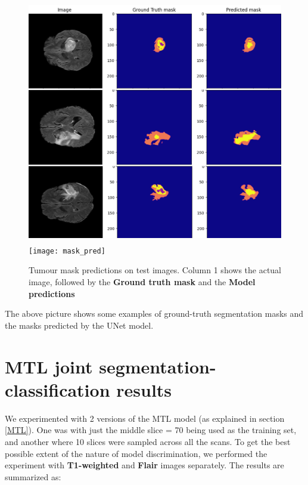 \begin{figure}[H]
  \begin{center}
    \leavevmode
    \ifpdf
      \includegraphics[height=4.2in]{Results/Chapter5Figs/mask_preds.png}
    \else
      \texttt{[image: mask\_pred]}
    \fi
    \caption{Tumour mask predictions on test images. Column 1 shows the actual image, followed by the \textbf{Ground truth mask} and the \textbf{Model predictions}}
    \label{mask_pred}
  \end{center}
\end{figure}

The above picture shows some examples of ground-truth segmentation masks and the masks predicted by the UNet model.

\vspace{8mm}
\section{MTL joint segmentation-classification results}\label{MTL_results}
\vspace{3mm}
We experimented with 2 versions of the MTL model (as explained in section \ref{MTL}). One was with just the middle slice = 70 being used as the training set, and another where 10 slices were sampled across all the scans. To get the best possible extent of the nature of model discrimination, we performed the experiment with \textbf{T1-weighted} and \textbf{Flair} images separately. The results are summarized as: 

